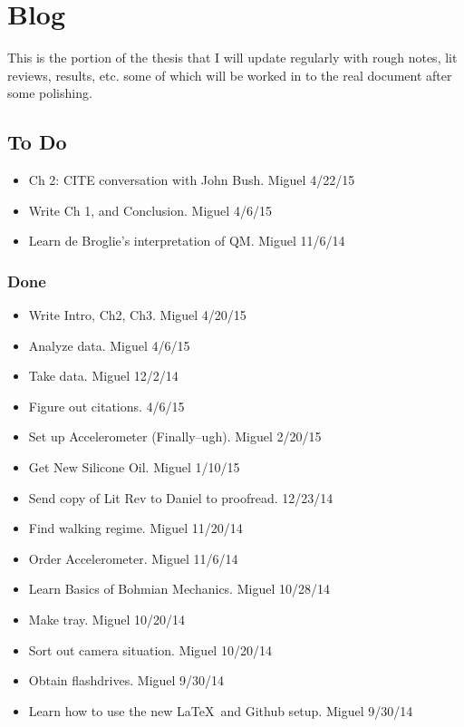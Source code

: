 \chapter*{Blog}
	
	This is the portion of the thesis that I will update regularly with rough notes, lit reviews, results, etc. some of which will be worked in to the real document after some polishing. 

	
	
	\section{To Do}
	\begin{itemize}
	\item{Ch 2: CITE conversation with John Bush.  Miguel 4/22/15}
	\item{Write Ch 1, and Conclusion. Miguel 4/6/15}
     \item{Learn de Broglie's interpretation of QM. Miguel 11/6/14}
	\end{itemize}
	
	\subsection{Done}
	
	\begin{itemize}
	\item{Write Intro, Ch2, Ch3. Miguel 4/20/15}
	\item{Analyze data. Miguel 4/6/15}
	 \item{Take data. Miguel 12/2/14}
        \item{Figure out citations. 4/6/15}
	 \item{Set up Accelerometer (Finally--ugh). Miguel 
 2/20/15}
     \item{Get New Silicone Oil. Miguel 1/10/15}
     \item{Send copy of Lit Rev to Daniel to proofread. 12/23/14}
	\item{Find walking regime. Miguel 11/20/14}
	\item{Order Accelerometer. Miguel 11/6/14}
	\item{Learn Basics of Bohmian Mechanics. Miguel 10/28/14}
	\item{Make tray. Miguel 10/20/14}
	\item{Sort out camera situation. Miguel 10/20/14}
	\item{Obtain flashdrives.    Miguel 9/30/14}
	\item{Learn how to use the new \LaTeX\ and Github setup. Miguel 9/30/14}
	\end{itemize}
	
